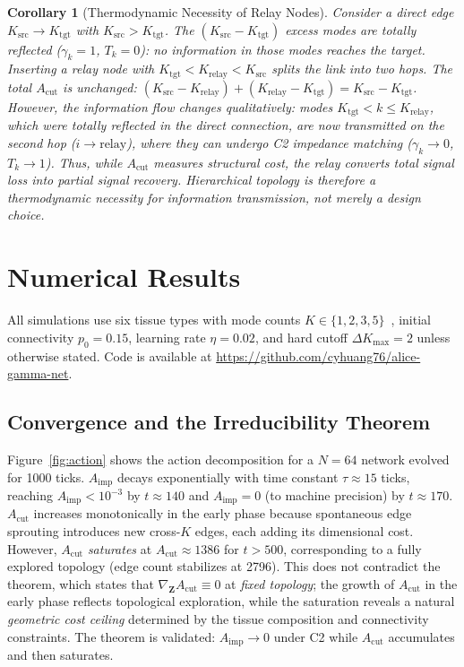 \documentclass[aps,pre,twocolumn,superscriptaddress,floatfix]{revtex4-2}
\newtheorem{corollary}{Corollary}
\newcommand{\Aimp}{A_{\text{imp}}}
\newcommand{\Acut}{A_{\text{cut}}}
\newcommand{\Krelay}{K_{\text{relay}}}
\begin{document}
\begin{corollary}[Thermodynamic Necessity of Relay Nodes]
\label{cor:relay}
Consider a direct edge $K_{\text{src}} \to K_{\text{tgt}}$
with $K_{\text{src}} > K_{\text{tgt}}$.
The $(K_{\text{src}} - K_{\text{tgt}})$ excess modes are
totally reflected ($\gamma_k = 1$, $T_k = 0$):
no information in those modes reaches the target.
Inserting a relay node with
$K_{\text{tgt}} < \Krelay < K_{\text{src}}$ splits the link
into two hops.
The total $\Acut$ is unchanged:
$(K_{\text{src}} - \Krelay) + (\Krelay - K_{\text{tgt}})
 = K_{\text{src}} - K_{\text{tgt}}$.
However, the \emph{information flow} changes qualitatively:
modes $K_{\text{tgt}} < k \le \Krelay$, which were totally
reflected in the direct connection, are now
\emph{transmitted} on the second hop ($i \to \text{relay}$),
where they can undergo C2 impedance matching ($\gamma_k \to 0$,
$T_k \to 1$).
Thus, while $\Acut$ measures \emph{structural cost},
the relay converts \emph{total signal loss} into
\emph{partial signal recovery}.
Hierarchical topology is therefore a thermodynamic necessity
for information transmission, not merely a design choice.
\end{corollary}

\section{Numerical Results}
\label{sec:results}

All simulations use six tissue types with mode counts
$K \in \{1, 2, 3, 5\}$~\cite{ALICE_code}, initial connectivity $p_0 = 0.15$,
learning rate $\eta = 0.02$, and hard cutoff
$\Delta K_{\max} = 2$ unless otherwise stated.
Code is available at \url{https://github.com/cyhuang76/alice-gamma-net}.

\subsection{Convergence and the Irreducibility Theorem}
\label{sec:convergence}

Figure~\ref{fig:action} shows the action decomposition for a
$N = 64$ network evolved for 1000 ticks.
$\Aimp$ decays exponentially with time constant
$\tau \approx 15$ ticks, reaching $\Aimp < 10^{-3}$ by $t \approx 140$
and $\Aimp = 0$ (to machine precision) by $t \approx 170$.
$\Acut$ increases monotonically in the early phase
because spontaneous edge sprouting introduces new cross-$K$
edges, each adding its dimensional cost.
However, $\Acut$ \emph{saturates} at $\Acut \approx 1386$
for $t > 500$, corresponding to a fully explored topology
(edge count stabilizes at 2796).
This does not contradict the theorem, which states that
$\nabla_{\mathbf{Z}} \Acut \equiv 0$ at \emph{fixed topology};
the growth of $\Acut$ in the early phase reflects topological
exploration, while the saturation reveals a natural
\emph{geometric cost ceiling} determined by the tissue
composition and connectivity constraints.
The theorem is validated: $\Aimp \to 0$ under C2 while
$\Acut$ accumulates and then saturates.
\end{document}
